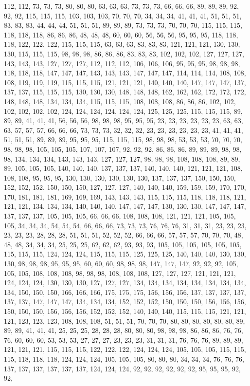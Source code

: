 112, 112, 73, 73, 73, 80, 80, 80, 63, 63, 63, 73, 73, 73, 66, 66, 66, 89, 89, 89, 92, 92, 92, 115, 115, 115, 103, 103, 103, 70, 70, 70, 34, 34, 34, 41, 41, 41, 51, 51, 51, 83, 83, 83, 44, 44, 44, 51, 51, 51, 89, 89, 89, 73, 73, 73, 70, 70, 70, 115, 115, 115, 118, 118, 118, 86, 86, 86, 48, 48, 48, 60, 60, 60, 56, 56, 56, 95, 95, 95, 118, 118, 118, 122, 122, 122, 115, 115, 115, 63, 63, 63, 83, 83, 83, 121, 121, 121, 130, 130, 130, 115, 115, 115, 98, 98, 98, 86, 86, 86, 83, 83, 83, 102, 102, 102, 127, 127, 127, 143, 143, 143, 127, 127, 127, 112, 112, 112, 106, 106, 106, 95, 95, 95, 98, 98, 98, 118, 118, 118, 147, 147, 147, 143, 143, 143, 147, 147, 147, 114, 114, 114, 108, 108, 108, 119, 119, 119, 115, 115, 115, 121, 121, 121, 140, 140, 140, 147, 147, 147, 137, 137, 137, 115, 115, 115, 130, 130, 130, 148, 148, 148, 162, 162, 162, 172, 172, 172, 148, 148, 148, 134, 134, 134, 115, 115, 115, 108, 108, 108, 86, 86, 86, 102, 102, 102, 102, 102, 102, 124, 124, 124, 124, 124, 124, 125, 125, 125, 115, 115, 115, 89, 89, 89, 41, 41, 41, 56, 56, 56, 98, 98, 98, 95, 95, 95, 23, 23, 23, 23, 23, 23, 63, 63, 63, 57, 57, 57, 66, 66, 66, 73, 73, 73, 32, 32, 32, 23, 23, 23, 23, 23, 23, 41, 41, 41, 51, 51, 51, 89, 89, 89, 95, 95, 95, 115, 115, 115, 98, 98, 98, 53, 53, 53, 70, 70, 70, 98, 98, 98, 105, 105, 105, 107, 107, 107, 92, 92, 92, 86, 86, 86, 89, 89, 89, 98, 98, 98, 134, 134, 134, 143, 143, 143, 127, 127, 127, 98, 98, 98, 108, 108, 108, 89, 89, 89, 105, 105, 105, 140, 140, 140, 137, 137, 137, 140, 140, 140, 121, 121, 121, 108, 108, 108, 95, 95, 95, 130, 130, 130, 130, 130, 130, 137, 137, 137, 150, 150, 150, 152, 152, 152, 150, 150, 150, 127, 127, 127, 140, 140, 140, 159, 159, 159, 170, 170, 170, 181, 181, 181, 169, 169, 169, 143, 143, 143, 115, 115, 115, 118, 118, 118, 121, 121, 121, 134, 134, 134, 140, 140, 140, 147, 147, 147, 130, 130, 130, 147, 147, 147, 137, 137, 137, 105, 105, 105, 66, 66, 66, 108, 108, 108, 121, 121, 121, 105, 105, 105, 34, 34, 34, 54, 54, 54, 66, 66, 66, 73, 73, 73, 76, 76, 76, 31, 31, 31, 23, 23, 23, 23, 23, 23, 28, 28, 28, 51, 51, 51, 52, 52, 52, 66, 66, 66, 57, 57, 57, 70, 70, 70, 48, 48, 48, 34, 34, 34, 25, 25, 25, 62, 62, 62, 93, 93, 93, 105, 105, 105, 105, 105, 105, 115, 115, 115, 124, 124, 124, 115, 115, 115, 125, 125, 125, 140, 140, 140, 130, 130, 130, 98, 98, 98, 95, 95, 95, 60, 60, 60, 98, 98, 98, 147, 147, 147, 92, 92, 92, 105, 105, 105, 108, 108, 108, 98, 98, 98, 108, 108, 108, 127, 127, 127, 121, 121, 121, 124, 124, 124, 130, 130, 130, 127, 127, 127, 134, 134, 134, 134, 134, 134, 134, 134, 134, 150, 150, 150, 166, 166, 166, 175, 175, 175, 156, 156, 156, 137, 137, 137, 137, 137, 137, 147, 147, 147, 134, 134, 134, 152, 152, 152, 150, 150, 150, 156, 156, 156, 150, 150, 150, 156, 156, 156, 152, 152, 152, 140, 140, 140, 115, 115, 115, 121, 121, 121, 123, 123, 123, 108, 108, 108, 51, 51, 51, 70, 70, 70, 80, 80, 80, 80, 80, 80, 89, 89, 89, 41, 41, 41, 25, 25, 25, 28, 28, 28, 80, 80, 80, 98, 98, 98, 86, 86, 86, 76, 76, 76, 60, 60, 60, 53, 53, 53, 27, 27, 27, 23, 23, 23, 31, 31, 31, 76, 76, 76, 89, 89, 89, 121, 121, 121, 115, 115, 115, 122, 122, 122, 124, 124, 124, 105, 105, 105, 115, 115, 115, 118, 118, 118, 124, 124, 124, 105, 105, 105, 80, 80, 80, 34, 34, 34, 76, 76, 76, 137, 137, 137, 137, 137, 137, 124, 124, 124, 92, 92, 92, 92, 92, 92, 95, 95, 95, 92, 92, 